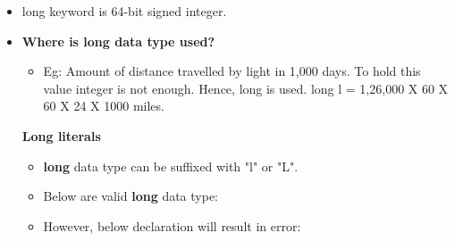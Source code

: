 

\begin{flushleft}
	
	\begin{itemize}
		\item long keyword is 64-bit signed integer. 
		
		
		\bigskip
		\item \textbf{Where is long data type used?}
		\begin{itemize}
			\item Eg: Amount of distance travelled by light in 1,000 days. To hold this value integer is not enough. Hence, long is used.
			\newline
			long l = 1,26,000 X 60 X 60 X 24 X 1000 miles.
			\bigskip
			
		\end{itemize}	
	
		\textbf{Long literals}
		\begin{itemize}
			\item \textbf{long} data type can be suffixed with "l" or "L".
			
			\item Below are valid \textbf{long} data type:
			
			\item However, below declaration will result in error:

		\end{itemize}
		
		
	\end{itemize}
	
\end{flushleft}
